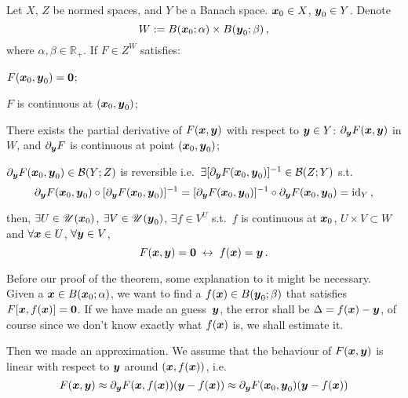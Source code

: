 \documentclass[openany]{book}
\begin{document}
\begin{theorem}
	\label{theorem: implicit function theorem}
	Let $X$, $Z$ be normed spaces, and $Y$ be a Banach space.
	$\boldsymbol{x}_0 \in X$, $\boldsymbol{y}_0 \in Y$. Denote
	\begin{equation*}
		W := B(\boldsymbol{x}_0; \alpha) \times B(\boldsymbol{y}_0; \beta)\,,
	\end{equation*}
	where $\alpha, \beta \in \mathbb R_+$.
	If $F \in Z^W$ satisfies:
	\begin{conditionlist}[label=\alph*)]
		\item $F(\boldsymbol{x}_0, \boldsymbol{y}_0) = \boldsymbol{0}$;
		\item $F$ is continuous at $(\boldsymbol{x}_0, \boldsymbol{y}_0)$;
		\item There exists the partial derivative of $F(\boldsymbol{x}, \boldsymbol{y})$ with respect to $\boldsymbol{y} \in Y$: $\partial_{\boldsymbol{y}} F(\boldsymbol{x}, \boldsymbol{y})$ in $W$, and $\partial_{\boldsymbol{y}} F$ is continuous at point $(\boldsymbol{x}_0, \boldsymbol{y}_0)$;
		\item $\partial_{\boldsymbol{y}} F(\boldsymbol{x}_0, \boldsymbol{y}_0) \in \mathcal B(Y; Z)$ is reversible i.e.\ $\exists [\partial_{\boldsymbol{y}} F(\boldsymbol{x}_0, \boldsymbol{y}_0)]^{-1} \in \mathcal B(Z; Y)$ s.t.
		\begin{equation*}
			\partial_{\boldsymbol{y}} F(\boldsymbol{x}_0, \boldsymbol{y}_0) \circ [\partial_{\boldsymbol{y}} F(\boldsymbol{x}_0, \boldsymbol{y}_0)]^{-1} 
			= [\partial_{\boldsymbol{y}} F(\boldsymbol{x}_0, \boldsymbol{y}_0)]^{-1} \circ \partial_{\boldsymbol{y}} F(\boldsymbol{x}_0, \boldsymbol{y}_0) = \operatorname{id}_Y\,,
		\end{equation*}
	\end{conditionlist}
	then, $\exists U \in \mathscr U(\boldsymbol{x}_0)$, $\exists V \in \mathscr U(\boldsymbol{y}_0)$, $\exists f \in V^U$ s.t.\ $f$ is continuous at $\boldsymbol{x}_0$, $U \times V \subset W$ and $\forall \boldsymbol{x} \in U$, $\forall \boldsymbol{y} \in V$, 
	\begin{equation*}
		F(\boldsymbol{x}, \boldsymbol{y}) = \boldsymbol{0}
		\;\leftrightarrow\;
		f(\boldsymbol{x}) = \boldsymbol{y}\,.
	\end{equation*}
\end{theorem}

Before our proof of the theorem, some explanation to it might be necessary. 
Given a $\boldsymbol{x} \in B(\boldsymbol{x}_0; \alpha)$, we want to find a $f(\boldsymbol{x}) \in B(\boldsymbol{y}_0; \beta)$ that satisfies $F[\boldsymbol{x}, f(\boldsymbol{x})] = \boldsymbol{0}$. 
If we have made an guess~$\boldsymbol{y}$, the error shall be $\Delta = f(\boldsymbol{x}) - \boldsymbol{y}$, of course since we don't know exactly what $f(\boldsymbol{x})$ is, we shall estimate it.

Then we made an approximation. 
We assume that the behaviour of $F(\boldsymbol{x}, \boldsymbol{y})$ is linear with respect to $\boldsymbol{y}$ around $(\boldsymbol{x}, f(\boldsymbol{x}))$, i.e.\ 
\begin{equation*}
	F(\boldsymbol{x}, \boldsymbol{y}) \approx \partial_{\boldsymbol{y}} F(\boldsymbol{x}, f(\boldsymbol{x})) (\boldsymbol{y} - f(\boldsymbol{x}))
	\approx \partial_{\boldsymbol{y}} F(\boldsymbol{x}_0, \boldsymbol{y}_0) (\boldsymbol{y} - f(\boldsymbol{x}))
\end{equation*}
\end{document}
